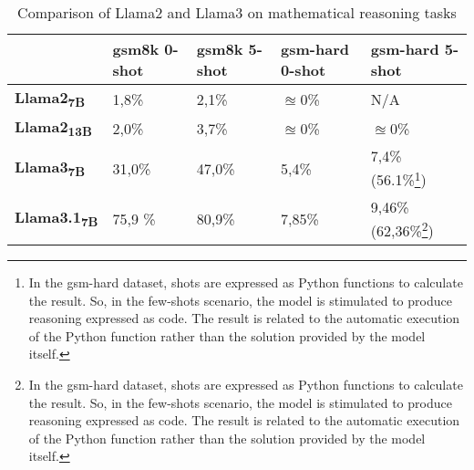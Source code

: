 \begin{table}[h!]
	\centering
	\begin{tabularx}{\textwidth}{|X|X|X|X|X|}
		\hline
		                                    & \textbf{gsm8k 0-shot} & \textbf{gsm8k 5-shot} & \textbf{gsm-hard 0-shot} & \textbf{gsm-hard 5-shot}                                                                                                                                                                                                                                                                                                                           \\
		\hline
		\textbf{Llama2\textsubscript{7B}}   & 1,8\%                 & 2,1\%                 & $\approxeq$0\%           & N/A                                                                                                                                                                                                                                                                                                                                                \\
		\hline
		\textbf{Llama2\textsubscript{13B}}  & 2,0\%                 & 3,7\%                 & $\approxeq$0\%           & $\approxeq$0\%                                                                                                                                                                                                                                                                                                                                     \\
		\hline
		\textbf{Llama3\textsubscript{7B}}   & 31,0\%                & 47,0\%                & 5,4\%                    & 7,4\% (56.1\%\footnote{In the gsm-hard dataset, shots are expressed as Python functions to calculate the result. So, in the few-shots scenario, the model is stimulated to produce reasoning expressed as code. The result is related to the automatic execution of the Python function rather than the solution provided by the model itself.})   \\
		\hline
		\textbf{Llama3.1\textsubscript{7B}} & 75,9 \%               & 80,9\%                & 7,85\%                   & 9,46\% (62,36\%\footnote{In the gsm-hard dataset, shots are expressed as Python functions to calculate the result. So, in the few-shots scenario, the model is stimulated to produce reasoning expressed as code. The result is related to the automatic execution of the Python function rather than the solution provided by the model itself.}) \\
		\hline
	\end{tabularx}
	\caption{Comparison of Llama2 and Llama3 on mathematical reasoning tasks}
	\label{tab:llama-comparison}
\end{table}

